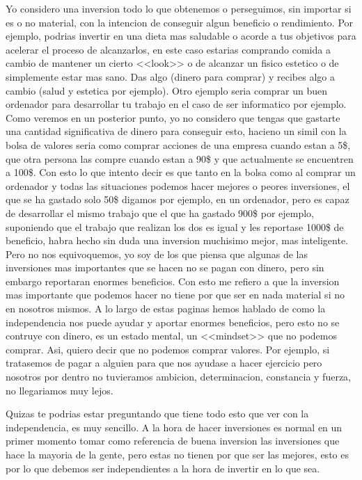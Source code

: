 Yo considero una inversion todo lo que obtenemos o perseguimos, sin importar si es o no material, con la intencion de conseguir algun beneficio o rendimiento. Por ejemplo, podrias invertir en una dieta mas saludable o acorde a tus objetivos para acelerar el proceso de alcanzarlos, en este caso estarias comprando comida a cambio de mantener un cierto <<look>> o de alcanzar un fisico estetico o de simplemente estar mas sano. Das algo (dinero para comprar) y recibes algo a cambio (salud y estetica por ejemplo). Otro ejemplo seria comprar un buen ordenador para desarrollar tu trabajo en el caso de ser informatico por ejemplo. Como veremos en un posterior punto, yo no considero que tengas que gastarte una cantidad significativa de dinero para conseguir esto, hacieno un simil con la bolsa de valores seria como comprar acciones de una empresa cuando estan a 5\$, que otra persona las compre cuando estan a 90\$ y que actualmente se encuentren a 100\$. Con esto lo que intento decir es que tanto en la bolsa como al comprar un ordenador y todas las situaciones podemos hacer mejores o peores inversiones, el que se ha gastado solo 50\$ digamos por ejemplo, en un ordenador, pero es capaz de desarrollar el mismo trabajo que el que ha gastado 900\$ por ejemplo, suponiendo que el trabajo que realizan los dos es igual y les reportase 1000\$ de beneficio, habra hecho sin duda una inversion muchisimo mejor, mas inteligente.\\

Pero no nos equivoquemos, yo soy de los que piensa que algunas de las inversiones mas importantes que se hacen no se pagan con dinero, pero sin embargo reportaran enormes beneficios. Con esto me refiero a que la inversion mas importante que podemos hacer no tiene por que ser en nada material si no en nosotros mismos. A lo largo de estas paginas hemos hablado de como la independencia nos puede ayudar y aportar enormes beneficios, pero esto no se contruye con dinero, es un estado mental, un <<mindset>> que no podemos comprar. Asi, quiero decir que no podemos comprar valores. Por ejemplo, si tratasemos de pagar a alguien para que nos ayudase a hacer ejercicio pero nosotros por dentro no tuvieramos ambicion, determinacion, constancia y fuerza, no llegariamos muy lejos. 

Quizas te podrias estar preguntando que tiene todo esto que ver con la independencia, es muy sencillo. A la hora de hacer inversiones es normal en un primer momento tomar como referencia de buena inversion las inversiones que hace la mayoria de la gente, pero estas no tienen por que ser las mejores, esto es por lo que debemos ser independientes a la hora de invertir en lo que sea.\\

